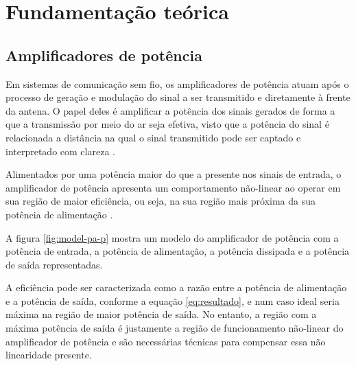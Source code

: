 \chapter{Fundamentação teórica} \label{cha:fundteo}

\section{Amplificadores de potência} \label{sec:fundteo-pa}

Em sistemas de comunicação sem fio, os amplificadores de potência atuam após o processo de geração e modulação do sinal a ser transmitido e diretamente à frente da antena. O papel deles é amplificar a potência dos sinais gerados de forma a que a transmissão por meio do ar seja efetiva, visto que a potência do sinal é relacionada a distância na qual o sinal transmitido pode ser captado e interpretado com clareza \cite{raychaudhuri_frontiers_2012}.

Alimentados por uma potência maior do que a presente nos sinais de entrada, o amplificador de potência apresenta um comportamento não-linear ao operar em sua região de maior eficiência, ou seja, na sua região mais próxima da sua potência de alimentação \cite{cripps_rf_2006}.

A figura \autoref{fig:model-pa-p} mostra um modelo do amplificador de potência com a potência de entrada, a potência de alimentação, a potência dissipada e a potência de saída representadas.


A eficiência \label{item:efi} pode ser caracterizada como a razão entre a potência de alimentação e a potência de saída, conforme a equação \ref{eq:resultado}, e num caso ideal seria máxima na região de maior potência de saída. No entanto, a região com a máxima potência de saída é justamente a região de funcionamento não-linear do amplificador de potência e são necessárias técnicas para compensar essa não linearidade presente.

